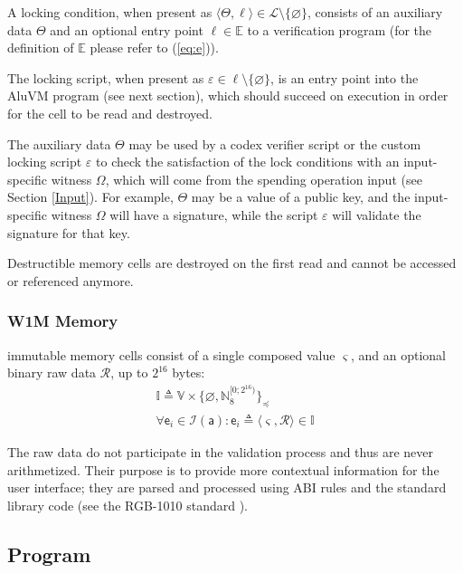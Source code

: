 \documentclass[9pt,oneside]{amsart}
\begin{document}
\begin{multicols}{2}
A locking condition, when present as $\langle \Theta, \ell \rangle \in \mathcal{L} \setminus \{ \varnothing \}$,
consists of an auxiliary data $\Theta$ and an optional entry point $\ell \in \mathbb{E}$ to a verification program
(for the definition of $\mathbb{E}$ please refer to (\ref{eq:e})).

The locking script, when present as $\varepsilon \in \ell \setminus \{ \varnothing \}$,
is an entry point into the AluVM program (see next section),
which should succeed on execution in order for the cell to be read and destroyed.

The auxiliary data $\Theta$ may be used by a codex verifier script or the custom locking script $\varepsilon$
to check the satisfaction of the lock conditions with an input-specific witness $\Omega$,
which will come from the spending operation input (see Section \ref{Input}).
For example, $\Theta$ may be a value of a public key,
and the \gls{input-specific witness} $\Omega$ will have a signature,
while the script $\varepsilon$ will validate the signature for that key.

Destructible memory cells are destroyed on the first read and cannot be accessed or referenced anymore.

\subsubsection{W1M Memory}\label{W1M}

\Gls{immutable memory} cells consist of a single \gls{composed value} $\varsigma$,
and an optional binary raw data $\mathcal{R}$, up to $2^{16}$ bytes:
\noindent
\begin{gather}
\mathbb{I} \triangleq \mathbb{V} \times \{ \varnothing, \mathbb{N}_8^{[0; 2^{16})} \}_\preceq \\
\forall \mathsf{e}_i \in \mathcal{I}(\mathsf{a}) : \mathsf{e}_i \triangleq \langle \varsigma, \mathcal{R} \rangle \in \mathbb{I}
\end{gather}

The raw data do not participate in the validation process and thus are never arithmetized.
Their purpose is to provide more contextual information for the user interface;
they are parsed and processed using ABI rules and the standard library code
(see the RGB-1010 standard \cite{RGB1010}).


\subsection{Program}\label{Program}


\end{multicols}
\end{document}
